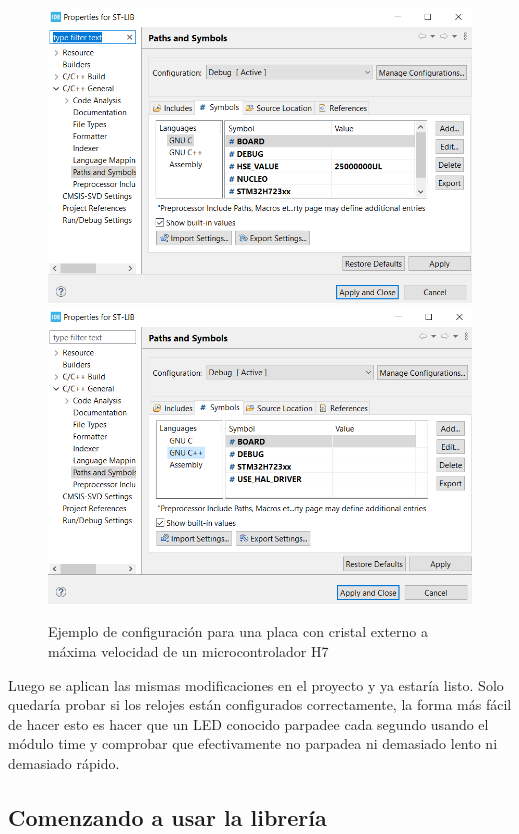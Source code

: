 \documentclass{report}
\begin{document}
\begin{figure}[h]
  \includegraphics[scale=0.45]{Imagenes/Modificar Simbolos ST-LIB.png}
  \includegraphics[scale=0.45]{Imagenes/Modificar Simbolos ST-LIB++.png}
  \caption{Ejemplo de configuración para una placa con cristal externo a máxima velocidad de un microcontrolador H7}
  \label{configSTLIBenviroment}
\end{figure}

Luego se aplican las mismas modificaciones en el proyecto y ya estaría listo. Solo quedaría probar si los relojes están configurados correctamente, la forma más fácil de hacer esto es hacer que un LED conocido parpadee cada segundo usando el módulo time y comprobar que efectivamente no parpadea ni demasiado lento ni demasiado rápido. 

\subsection{Comenzando a usar la librería}
\end{document}
